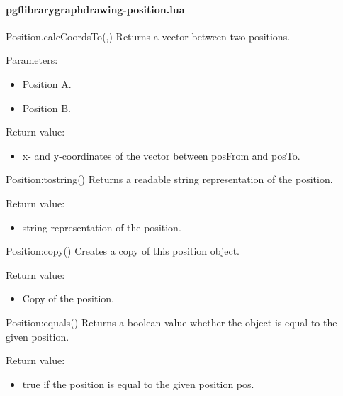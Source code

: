 
\paragraph{pgflibrarygraphdrawing-position.lua}


\begin{luacommand}{{Position.calcCoordsTo}(,)}
Returns a vector between two positions.

Parameters:
\begin{itemize}
	\item[]  \subitem Position A.\item[]  \subitem Position B.
\end{itemize}


Return value:
\begin{itemize} \item[] x- and y-coordinates of the vector between posFrom and posTo. \end{itemize}


\end{luacommand}\begin{luacommand}{{Position:\textunderscore{}\textunderscore{}tostring}()}
Returns a readable string representation of the position.


Return value:
\begin{itemize} \item[] string representation of the position. \end{itemize}


\end{luacommand}\begin{luacommand}{{Position:copy}()}
Creates a copy of this position object.


Return value:
\begin{itemize} \item[] Copy of the position. \end{itemize}


\end{luacommand}\begin{luacommand}{{Position:equals}()}
Returns a boolean value whether the object is equal to the given position.


Return value:
\begin{itemize} \item[] true if the position is equal to the given position pos. \end{itemize}



\end{luacommand}
